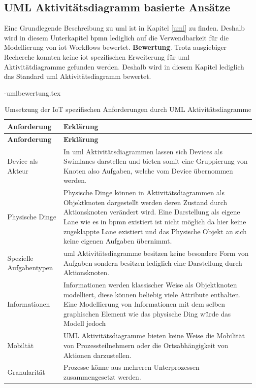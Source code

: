 \documentclass[a4paper, 12pt, twoside, headsepline=true]{scrartcl} %
\begin{document}
\subsection{UML Aktivitätsdiagramm basierte Ansätze}
Eine Grundlegende Beschreibung zu \ac{uml} ist in Kapitel \ref{uml} zu finden. Deshalb wird in diesem Unterkapitel \ac{bpmn} lediglich auf die Verwendbarkeit für die Modellierung von \ac{iot} Workflows bewertet.
\textbf{Bewertung}. Trotz ausgiebiger Recherche konnten keine \ac{iot} spezifischen Erweiterung für \ac{uml} Aktivitätdiagramme gefunden werden. Deshalb wird in diesem Kapitel lediglich das Standard \ac{uml} Aktivitätsdiagramm bewertet.

\begin{filecontents}{\jobname-umlbewertung.tex}
	\begin{longtable}{P{4cm}|X}
		\caption{Umsetzung der IoT spezifischen Anforderungen durch UML Aktivitätsdiagramme}\\
		\label{table:evaluierungskriterien}
		\textbf{Anforderung} & \textbf{Erklärung}   \\ \hline
		\endfirsthead %
		\textbf{Anforderung} & \textbf{Erklärung}  \\ \hline
		\endhead %
		Device als Akteur & In \ac{uml} Aktivitätsdiagrammen lassen sich Devices als Swimlanes darstellen und bieten somit eine Gruppierung von Knoten also Aufgaben, welche vom Device übernommen werden.\\ \hline
		Physische Dinge  & Physische Dinge können in Aktivitätsdiagrammen als Objektknoten dargestellt werden deren Zustand durch Aktionsknoten verändert wird. Eine Darstellung als eigene Lane wie es in \ac{bpmn} existiert ist nicht möglich da hier keine zugeklappte Lane existiert und das Physische Objekt an sich keine eigenen Aufgaben übernimmt.\\ \hline
		Spezielle Aufgabentypen & \ac{uml} Aktivitätsdiagramme besitzen keine besondere Form von Aufgaben sondern besitzen lediglich eine Darstellung durch Aktionsknoten. \\ \hline
		Informationen  & Informationen werden klassischer Weise als Objektknoten modelliert, diese können beliebig viele Attribute enthalten. Eine Modellierung von Informationen mit dem selben graphischen Element wie das physische Ding würde das Modell jedoch \\ \hline
		Mobiltät & UML Aktivitätsdiagramme bieten keine Weise die Mobilität von Prozessteilnehmern oder die Ortsabhängigkeit von Aktionen darzustellen.\\ \hline
		Granularität & Prozesse könne aus mehreren Unterprozessen zusammengesetzt werden.\\
	\end{longtable}
\end{filecontents}
\end{document}

